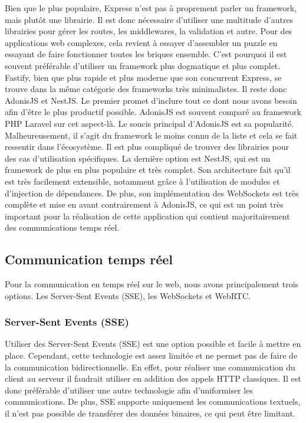 Bien que le plus populaire, Express n'est pas à proprement parler un framework, mais plutôt une librairie. Il est donc nécessaire d'utiliser une multitude d'autres librairies pour gérer les routes, les middlewares, la validation et autre. Pour des applications web complexes, cela revient à essayer d'assembler un puzzle en essayant de faire fonctionner toutes les briques ensemble. C'est pourquoi il est souvent préférable d'utiliser un framework plus dogmatique et plus complet. Fastify, bien que plus rapide et plus moderne que son concurrent Express, se trouve dans la même catégorie des frameworks très minimalistes. Il reste donc AdonisJS et NestJS. Le premier promet d'inclure tout ce dont nous avons besoin afin d'être le plus productif possible. AdonisJS est souvent comparé au framework PHP Laravel sur cet aspect-là. Le soucis principal d'AdonisJS est sa popularité. Malheureusement, il s'agit du framework le moins connu de la liste et cela se fait ressentir dans l'écosystème. Il est plus compliqué de trouver des librairies pour des cas d'utilisation spécifiques. La dernière option est NestJS, qui est un framework de plus en plus populaire et très complet. Son architecture fait qu'il est très facilement extensible, notamment grâce à l'utilisation de modules et d'injection de dépendances. De plus, son implémentation des WebSockets est très complète et mise en avant contrairement à AdonisJS, ce qui est un point très important pour la réalisation de cette application qui contient majoritairement des communications temps réel.

\subsection{Communication temps réel}

Pour la communication en temps réel sur le web, nous avons principalement trois options. Les Server-Sent Events (SSE), les WebSockets et WebRTC.

\subsubsection{Server-Sent Events (SSE)}
Utiliser des Server-Sent Events (SSE) est une option possible et facile à mettre en place. Cependant, cette technologie est assez limitée et ne permet pas de faire de la communication bidirectionnelle. En effet, pour réaliser une communication du client au serveur il faudrait utiliser en addition des appels HTTP classiques. Il est donc préférable d'utiliser une autre technologie afin d'uniformiser les communications. De plus, SSE supporte uniquement les communications textuels, il n'est pas possible de transférer des données binaires, ce qui peut être limitant.

